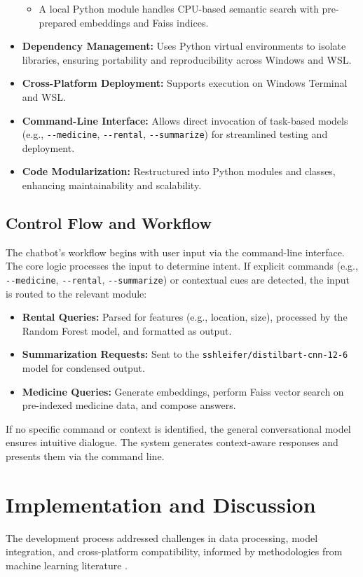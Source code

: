 \documentclass[a4paper,10pt,conference]{IEEEtran}
\begin{document}
\begin{itemize}
\begin{itemize}
        \item A local Python module handles CPU-based semantic search with pre-prepared embeddings and Faiss indices.
    \end{itemize}
    \item \textbf{Dependency Management:} Uses Python virtual environments to isolate libraries, ensuring portability and reproducibility across Windows and WSL.
    \item \textbf{Cross-Platform Deployment:} Supports execution on Windows Terminal and WSL.
    \item \textbf{Command-Line Interface:} Allows direct invocation of task-based models (e.g., \texttt{-{}-medicine}, \texttt{-{}-rental}, \texttt{-{}-summarize}) for streamlined testing and deployment.
    \item \textbf{Code Modularization:} Restructured into Python modules and classes, enhancing maintainability and scalability.
\end{itemize}

\subsection{Control Flow and Workflow}
The chatbot’s workflow begins with user input via the command-line interface. The core logic processes the input to determine intent. If explicit commands (e.g., \texttt{-{}-medicine}, \texttt{-{}-rental}, \texttt{-{}-summarize}) or contextual cues are detected, the input is routed to the relevant module:
\begin{itemize}
    \item \textbf{Rental Queries:} Parsed for features (e.g., location, size), processed by the Random Forest model, and formatted as output.
    \item \textbf{Summarization Requests:} Sent to the \texttt{sshleifer/distilbart-cnn-12-6} model for condensed output.
    \item \textbf{Medicine Queries:} Generate embeddings, perform Faiss vector search on pre-indexed medicine data, and compose answers.
\end{itemize}
If no specific command or context is identified, the general conversational model ensures intuitive dialogue. The system generates context-aware responses and presents them via the command line.

\section{Implementation and Discussion}
The development process addressed challenges in data processing, model integration, and cross-platform compatibility, informed by methodologies from machine learning literature \cite{b1}.
\end{document}
